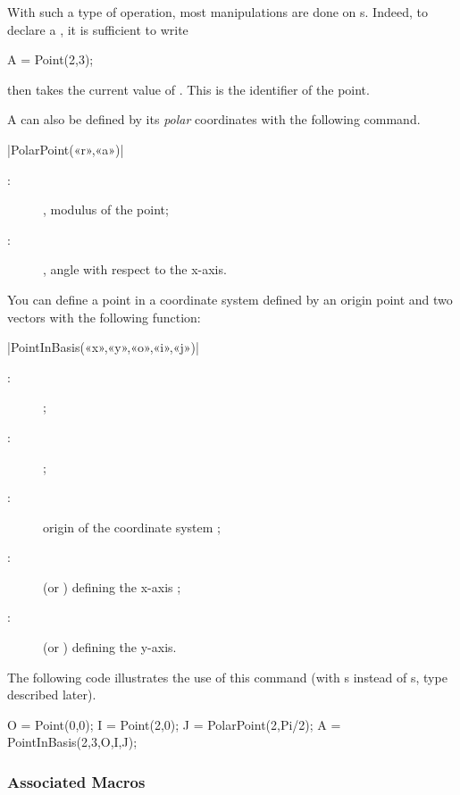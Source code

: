 \documentclass[a4paper,english]{article}
\begin{document}
With such a type of operation, most manipulations are done on s. Indeed, to declare a , it is sufficient to write
\begin{mpcode}
A = Point(2,3);
\end{mpcode}
 then takes the current value of . This is the identifier of the point.

A  can also be defined by its \emph{polar} coordinates with the following command.

\begin{colourband}
\macro|PolarPoint(«r»,«a»)|
\begin{description}
  \item[:] , modulus of the point;
  \item[:] , angle with respect to the x-axis.
\end{description}
\end{colourband}
\bigskip

You can define a point in a coordinate system defined by an origin point and two vectors with the following function:
\begin{colourband}
\macro|PointInBasis(«x»,«y»,«o»,«i»,«j»)|
\begin{description}
  \item[:]  ;
  \item[:]  ;
  \item[:]  origin of the coordinate system ;
  \item[:]  (or ) defining the x-axis ;
  \item[:]  (or ) defining the y-axis.
\end{description}
\end{colourband}

\bigskip

The following code illustrates the use of this command (with s instead of s, type described later). 
\begin{mpcode}
O = Point(0,0);
I = Point(2,0);
J = PolarPoint(2,Pi/2);
A = PointInBasis(2,3,O,I,J);
\end{mpcode}

\subsubsection{Associated Macros}
\end{document}
